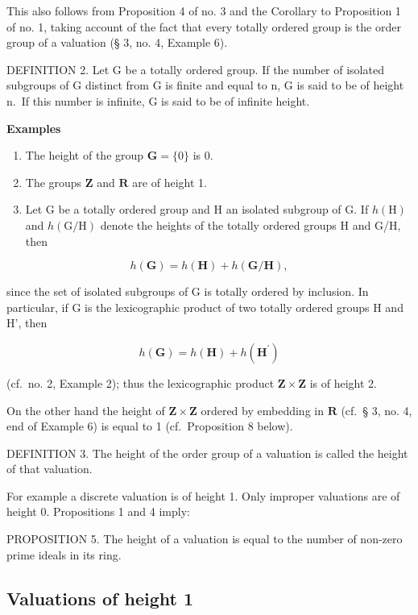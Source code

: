 This also follows from Proposition 4 of no. 3 and the Corollary to Proposition 1 of no. 1, taking account of the fact that every totally ordered group is the order group of a valuation (§ 3, no. 4, Example 6).

DEFINITION 2. Let G be a totally ordered group. If the number of isolated subgroups of G distinct from G is finite and equal to n, G is said to be of height n.~If this number is infinite, G is said to be of infinite height.

\textbf{Examples}\par

\begin{enumerate}
\def\labelenumi{(\arabic{enumi})}
\item
  The height of the group \(\mathbf{G} = \{0\}\) is 0.
\item
  The groups \(\mathbf{Z}\) and \(\mathbf{R}\) are of height 1.
\item
  Let G be a totally ordered group and H an isolated subgroup of G. If \(h(\mathrm{H})\) and \(h(\mathrm{G}/\mathrm{H})\) denote the heights of the totally ordered groups H and G/H, then
\end{enumerate}

\[
h (\mathbf {G}) = h (\mathbf {H}) + h (\mathbf {G} / \mathbf {H}),\tag{2}
\]

since the set of isolated subgroups of G is totally ordered by inclusion. In particular, if G is the lexicographic product of two totally ordered groups H and H', then

\[
h (\mathbf {G}) = h (\mathbf {H}) + h \left(\mathbf {H} ^ {\prime}\right)\tag{3}
\]

(cf.~no. 2, Example 2); thus the lexicographic product \(\mathbf{Z} \times \mathbf{Z}\) is of height 2.

On the other hand the height of \(\mathbf{Z} \times \mathbf{Z}\) ordered by embedding in \(\mathbf{R}\) (cf.~§ 3, no. 4, end of Example 6) is equal to 1 (cf.~Proposition 8 below).

DEFINITION 3. The height of the order group of a valuation is called the height of that valuation.

For example a discrete valuation is of height 1. Only improper valuations are of height 0. Propositions 1 and 4 imply:

PROPOSITION 5. The height of a valuation is equal to the number of non-zero prime ideals in its ring.

\subsection{Valuations of height 1}

